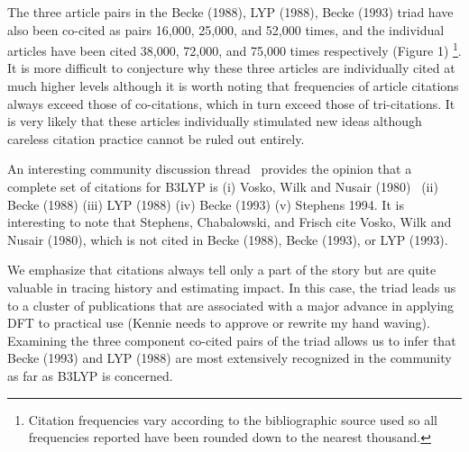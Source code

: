 \documentclass[notitlepage]{report}
\begin{document}
The three article pairs in the Becke (1988), LYP (1988), Becke (1993) triad have also been co-cited as pairs 16,000, 25,000, and 52,000 times, and the individual articles have been cited 38,000, 72,000, and 75,000 times respectively (Figure 1) \footnote{Citation frequencies vary according to the bibliographic source used so all frequencies reported have been rounded down to the nearest thousand.}. It is more difficult to conjecture why these three articles are individually cited at much higher levels although it is worth noting that  frequencies of article citations always exceed those of co-citations, which in turn exceed those of tri-citations. It is very likely that these articles individually stimulated new ideas although careless citation practice cannot be ruled out entirely.

An interesting community discussion thread~\citep{johansson2002} provides the opinion that a complete set of citations for B3LYP is (i) Vosko, Wilk and Nusair (1980)~\citep{vosko1980accurate} (ii) Becke (1988) (iii) LYP (1988) (iv) Becke (1993) (v) Stephens 1994. It is interesting to note that Stephens, Chabalowski, and Frisch cite Vosko, Wilk and Nusair (1980), which is not cited in Becke (1988), Becke (1993), or LYP (1993). 

We emphasize that citations always tell only a part of the story but are quite valuable in tracing history and estimating impact. In this case, the triad leads us to a cluster of publications that are associated with a major advance in applying DFT to practical use (Kennie needs to approve or rewrite my hand waving). Examining the three component co-cited pairs of the triad allows us to infer that Becke (1993) and LYP (1988) are most extensively recognized 
in the community as far as B3LYP is concerned. 



\end{document}
